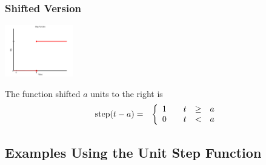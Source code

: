 \begin{frame}
  \frametitle{Shifted Version}

  \centerline{\includegraphics[width=3cm]{img/unitStepAta}}

    The function shifted $a$ units to the right is
    \begin{eqnarray*}
      \mathrm{step}(t-a) & = & 
      \left\{
        \begin{array}{r@{\hspace{2em}}rcl}
          1 & t & \geq & a \\
          0 & t & < & a
        \end{array}
      \right.
    \end{eqnarray*}


\end{frame}

\subsection{Examples Using the Unit Step Function}


